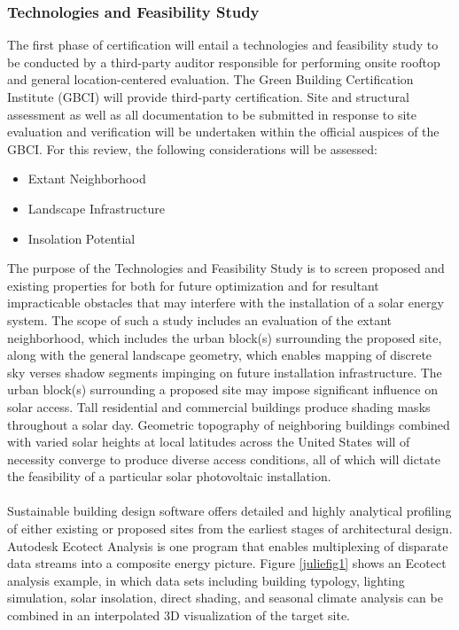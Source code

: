\subsubsection{Technologies and Feasibility Study}
The first phase of certification will entail a technologies and feasibility study to be conducted by a third-party auditor responsible for performing onsite rooftop and general location-centered evaluation. The Green Building Certification Institute (GBCI) will provide third-party certification. Site and structural assessment as well as all documentation to be submitted in response to site evaluation and verification will be undertaken within the official auspices of the GBCI. For this review, the following considerations will be assessed:

\begin{itemize}
\item Extant Neighborhood
\item Landscape Infrastructure
\item Insolation Potential
\end{itemize}

The purpose of the Technologies and Feasibility Study is to screen proposed and existing properties for both for future optimization and for resultant impracticable obstacles that may interfere with the installation of a solar energy system. The scope of such a study includes an evaluation of the extant neighborhood, which includes the urban block(s) surrounding the proposed site, along with the general landscape geometry, which enables mapping of discrete sky verses shadow segments impinging on future installation infrastructure. The urban block(s) surrounding a proposed site may impose significant influence on solar access. Tall residential and commercial buildings produce shading masks throughout a solar day. Geometric topography of neighboring buildings combined with varied solar heights at local latitudes across the United States will of necessity converge to produce diverse access conditions, all of which will dictate the feasibility of a particular solar photovoltaic installation.
\\\\
\noindent Sustainable building design software offers detailed and highly analytical profiling of either existing or proposed sites from the earliest stages of architectural design. Autodesk Ecotect Analysis is one program that enables multiplexing of disparate data streams into a composite energy picture. Figure \ref{juliefig1} shows an Ecotect analysis example, in which data sets including building typology, lighting simulation, solar insolation, direct shading, and seasonal climate analysis can be combined in an interpolated 3D visualization of the target site.

